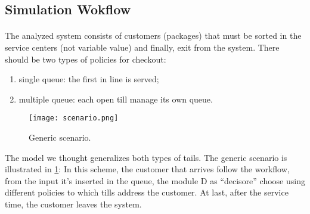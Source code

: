\subsection{Simulation Wokflow}
\paragraph{}
The analyzed system consists of customers (packages) that must be sorted in the service centers (not variable value) and finally, exit from the system. There should be two types of policies for checkout: 
\begin{enumerate}
	\item single queue: the first in line is served; 
	\item multiple queue: each open till manage its own queue.
\end{enumerate}
\begin{figure}[ht]
  \begin{center}
  \texttt{[image: scenario.png]}
  \caption{Generic scenario.}
  \label{fig:gs}
  \end{center}
\end{figure}
The model we thought generalizes both types of tails. The generic scenario is illustrated in \ref{fig:gs}:
In this scheme, the customer that arrives follow the workflow, from the input it’s inserted in the queue, the module D as “decisore” choose using different policies to which tills address the customer. At last, after the service time, the customer leaves the system. 
